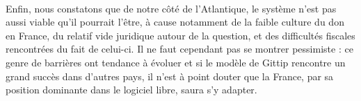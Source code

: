 \paragraph{}
Enfin, nous constatons que de notre côté de l'Atlantique, le système n'est pas 
aussi viable qu'il pourrait l'être, à cause notamment de la faible culture du 
don en France, du relatif vide juridique autour de la question, et des 
difficultés fiscales rencontrées du fait de celui-ci. Il ne faut cependant pas 
se montrer pessimiste : ce genre de barrières ont tendance à évoluer et si le 
modèle de Gittip rencontre un grand succès dans d'autres pays, il n'est à 
point douter que la France, par sa position dominante dans le logiciel libre, 
saura s'y adapter.
